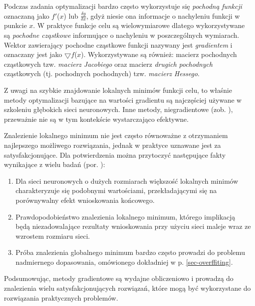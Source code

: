 Podczas zadania optymalizacji bardzo często wykorzystuje się \textit{pochodną funkcji} oznaczaną jako $f'$($x$) lub $\frac{\delta y}{\delta x}$, gdyż niesie ona informacje o nachyleniu funkcji \linebreak w punkcie $x$. W praktyce funkcje celu są wielowymiarowe dlatego wykorzystywane są \textit{pochodne cząstkowe} informujące o nachyleniu w poszczególnych wymiarach. Wektor zawierający pochodne cząstkowe funkcji nazywany jest \textit{gradientem} i oznaczany jest jako $\bigtriangledown f$($x$). Wykorzystywane są również: macierz pochodnych cząstkowych tzw. \textit{macierz Jacobiego} oraz macierz \textit{drugich pochodnych} cząstkowych (tj. pochodnych pochodnych) tzw. \textit{macierz Hessego}.

Z uwagi na szybkie znajdowanie lokalnych minimów funkcji celu, to właśnie metody optymalizacji bazujące na wartości gradientu są najczęściej używane w szkoleniu głębokich sieci neuronowych. Inne metody, niegradientowe (zob. \cite{DBLP:journals/corr/TaylorBXSPG16}), przeważnie nie są w tym kontekście wystarczająco efektywne. 

Znalezienie lokalnego minimum nie jest często równoważne z otrzymaniem najlepszego możliwego rozwiązania, jednak w praktyce uznawane jest za satysfakcjonujące. Dla potwierdzenia można przytoczyć następujące fakty wynikające z wielu badań (por. \cite{DBLP:journals/corr/ChoromanskaHMAL14}):
\begin{enumerate}
	\item Dla sieci neuronowych o dużych rozmiarach większość lokalnych minimów charakteryzuje się podobnymi wartościami, przekładającymi się na porównywalny efekt wnioskowania końcowego.
	\item Prawdopodobieństwo znalezienia lokalnego minimum, którego implikacją będą niezadowalające rezultaty wnioskowania przy użyciu sieci maleje wraz \linebreak ze wzrostem rozmiaru sieci.
	\item Próba znalezienia globalnego minimum bardzo często prowadzi do problemu nadmiernego dopasowania, omówionego dokładniej w p. \ref{sec-overffiting}.
\end{enumerate}

Podsumowując, metody gradientowe są wydajne obliczeniowo i prowadzą do znalezienia wielu satysfakcjonujących rozwiązań, które mogą być wykorzystane do rozwiązania praktycznych problemów. 

